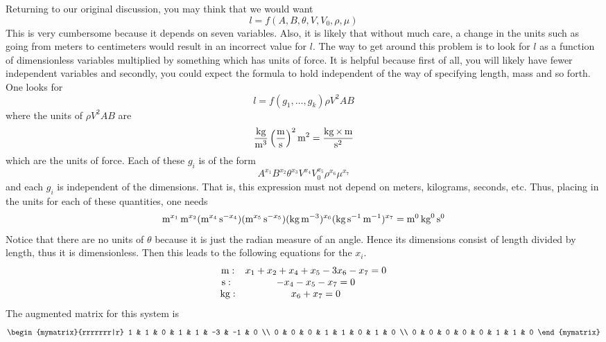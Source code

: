 Returning to our original discussion, you may think that we would want
\begin{equation*}
  l=f(A,B,\theta,V,V_0,\rho,\mu)
\end{equation*}
This is very cumbersome because it depends on seven variables. Also,
it is likely that without much care, a change in the units such as
going from meters to centimeters would result in an incorrect value
for $l$. The way to get around this problem is to look for $l $ as a
function of dimensionless variables multiplied by something which has
units of force. It is helpful because first of all, you will likely
have fewer independent variables and secondly, you could expect the
formula to hold independent of the way of specifying length, mass and
so forth. One looks for
\begin{equation*}
  l=f(g_1,\ldots,g_k) \rho V^2AB
\end{equation*}
where the units of $\rho V^2AB$ are
\begin{equation*}
  \frac{\mathop{\textrm{\rm kg}}\nolimits}{\mathop{\textrm{\rm m}}\nolimits^3}\left(\frac{\mathop{\textrm{\rm m}}\nolimits}{\mathop{\textrm{\rm s}}\nolimits}\right)^2\mathop{\textrm{\rm m}}\nolimits^2=\frac{\mathop{\textrm{\rm kg}}\nolimits\times \mathop{\textrm{\rm m}}\nolimits}{\mathop{\textrm{\rm s}}\nolimits^2}
\end{equation*}
which are the units of force. Each of these $g_i$ is of the form
\begin{equation}
  A^{x_1}B^{x_2}\theta^{x_3}V^{x_4}V_0^{x_5}\rho^{x_6}\mu
  ^{x_7}  \label{11-july-e1f}
\end{equation}
and each $g_i$ is independent of the dimensions. That is, this
expression must not depend on meters, kilograms, seconds, etc. Thus,
placing in the units for each of these quantities, one needs
\begin{equation*}
  \mathop{\textrm{\rm m}}\nolimits^{x_1}\mathop{\textrm{\rm m}}\nolimits^{x_2}(\mathop{\textrm{\rm m}}\nolimits^{x_4}\mathop{\textrm{\rm s}}\nolimits^{-x_4}) (\mathop{\textrm{\rm m}}\nolimits^{x_5}\mathop{\textrm{\rm s}}\nolimits
  ^{-x_5}) (\mathop{\textrm{\rm kg}}\nolimits\mathop{\textrm{\rm m}}\nolimits^{-3})^{x_6}(\mathop{\textrm{\rm kg}}\nolimits\mathop{\textrm{\rm s}}\nolimits
  ^{-1}\mathop{\textrm{\rm m}}\nolimits^{-1})^{x_7}=\mathop{\textrm{\rm m}}\nolimits^0\mathop{\textrm{\rm kg}}\nolimits^0\mathop{\textrm{\rm s}}\nolimits^0
\end{equation*}
Notice that there are no units of $\theta$ because it is just the
radian measure of an angle. Hence its dimensions consist of length
divided by length, thus it is dimensionless. Then this leads to the
following equations for the $x_i$.
\begin{equation*}
  \begin{array}{cc}
    \mathop{\textrm{\rm m}}\nolimits: & x_1+x_2+x_4+x_5-3x_6-x_7=0 \\
    \mathop{\textrm{\rm s}}\nolimits :\  & -x_4-x_5-x_7=0 \\
    \mathop{\textrm{\rm kg}}\nolimits: & x_6+x_7=0
  \end{array}
\end{equation*}
The augmented matrix for this system is
\begin{equation*}
  \begin{mymatrix}{rrrrrrr|r}
    1 & 1 & 0 & 1 & 1 & -3 & -1 & 0 \\
    0 & 0 & 0 & 1 & 1 & 0 & 1 & 0 \\
    0 & 0 & 0 & 0 & 0 & 1 & 1 & 0
  \end{mymatrix}
\end{equation*}

